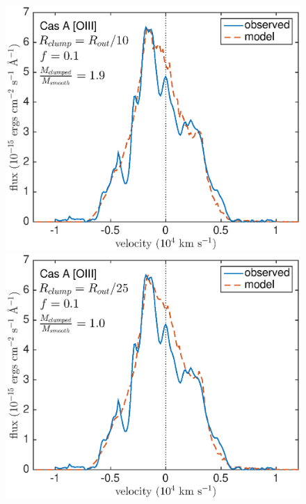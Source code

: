 \begin{figure}
\vspace{6mm}
\includegraphics[scale=0.43,clip=true, trim=30 0 50 20]{chapters/chapter6/figs/CasA/clumped/CasA_OIII_c10_f0_1}
\includegraphics[scale=0.43,clip=true, trim=30 0 40 20]{chapters/chapter6/figs/CasA/clumped/CasA_OIII_c25_f0_1}


\end{figure}

